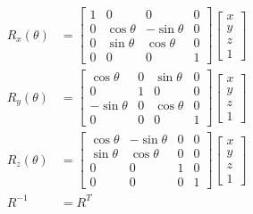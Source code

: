   \begin{align}
    R_{x}\left( \theta \right) &=
    \begin{bmatrix}
      1 & 0 & 0 & 0 \\
      0 & \cos\theta & -\sin\theta & 0 \\
      0 & \sin\theta & \cos\theta & 0 \\
      0 & 0 & 0 & 1
    \end{bmatrix}
    \begin{bmatrix}
      x \\
      y \\
      z \\
      1
    \end{bmatrix} \\
    R_{y}\left( \theta \right) &=
    \begin{bmatrix}
      \cos\theta & 0 & \sin\theta & 0 \\
      0 & 1 & 0 & 0 \\
      -\sin\theta & 0 & \cos\theta & 0 \\
      0 & 0 & 0 & 1
    \end{bmatrix}
    \begin{bmatrix}
      x \\
      y \\
      z \\
      1
    \end{bmatrix} \\
    R_{z}\left( \theta \right) &=
    \begin{bmatrix}
      \cos\theta & -\sin\theta & 0 & 0 \\
      \sin\theta & \cos\theta & 0 & 0 \\
      0 & 0 & 1 & 0 \\
      0 & 0 & 0 & 1
    \end{bmatrix}
    \begin{bmatrix}
      x \\
      y \\
      z \\
      1
    \end{bmatrix} \\
    R^{-1} &= R^{T}
  \end{align}

